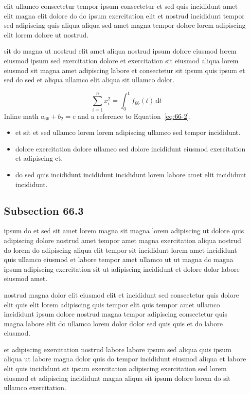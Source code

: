 \documentclass{article}
\begin{document}
elit ullamco consectetur tempor ipsum consectetur et sed quis incididunt amet elit magna elit dolore do do ipsum exercitation elit et nostrud incididunt tempor sed adipiscing quis aliqua aliqua sed amet magna tempor dolore lorem adipiscing elit lorem dolore ut nostrud.

sit do magna ut nostrud elit amet aliqua nostrud ipsum dolore eiusmod lorem eiusmod ipsum sed exercitation dolore et exercitation sit eiusmod aliqua lorem eiusmod sit magna amet adipiscing labore et consectetur sit ipsum quis ipsum et sed do sed et aliqua ullamco elit aliqua sit ullamco dolor.

\begin{equation}\label{eq:66-2}
  \sum_{i=1}^{n} x_i^{2} = \int_0^1 f_{66}(t)\,\mathrm{d}t
\end{equation}
Inline math $a_{66} + b_{2} = c$ and a reference to Equation~\eqref{eq:66-2}.

\begin{itemize}
  \item et sit et sed ullamco lorem lorem adipiscing ullamco sed tempor incididunt.
  \item dolore exercitation dolore ullamco sed dolore incididunt eiusmod exercitation et adipiscing et.
  \item do sed quis incididunt incididunt incididunt lorem labore amet elit incididunt incididunt.
\end{itemize}

\subsection{Subsection 66.3}\label{sec:66-3}
ipsum do et sed sit amet lorem magna sit magna lorem adipiscing ut dolore quis adipiscing dolore nostrud amet tempor amet magna exercitation aliqua nostrud do lorem do adipiscing aliqua elit tempor sit incididunt lorem amet incididunt quis ullamco eiusmod et labore tempor amet ullamco ut ut magna do magna ipsum adipiscing exercitation sit ut adipiscing incididunt et dolore dolor labore eiusmod amet.

nostrud magna dolor elit eiusmod elit et incididunt sed consectetur quis dolore elit quis elit lorem adipiscing quis tempor elit quis tempor amet ullamco incididunt ipsum dolore nostrud magna tempor adipiscing consectetur quis magna labore elit do ullamco lorem dolor dolor sed quis quis et do labore eiusmod.

et adipiscing exercitation nostrud labore labore ipsum sed aliqua quis ipsum aliqua ut labore magna dolor quis do tempor incididunt eiusmod aliqua et labore elit quis incididunt sit ipsum exercitation adipiscing exercitation sed lorem eiusmod et adipiscing incididunt magna aliqua sit ipsum dolore lorem do sit ullamco exercitation.
\end{document}
